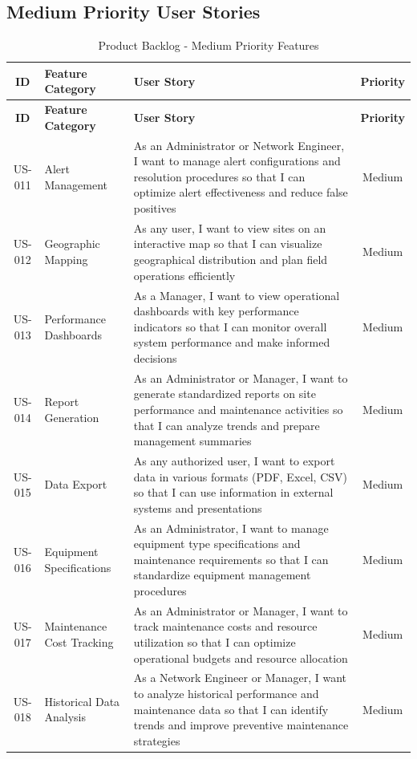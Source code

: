 \subsection{Medium Priority User Stories}

\begin{longtable}{|c|p{3.5cm}|p{7.5cm}|c|}
\caption{Product Backlog - Medium Priority Features} \\
\hline
\textbf{ID} & \textbf{Feature Category} & \textbf{User Story} & \textbf{Priority} \\
\hline
\endfirsthead
\hline
\textbf{ID} & \textbf{Feature Category} & \textbf{User Story} & \textbf{Priority} \\
\hline
\endhead
US-011 & Alert Management & As an Administrator or Network Engineer, I want to manage alert configurations and resolution procedures so that I can optimize alert effectiveness and reduce false positives & Medium \\
\hline
US-012 & Geographic Mapping & As any user, I want to view sites on an interactive map so that I can visualize geographical distribution and plan field operations efficiently & Medium \\
\hline
US-013 & Performance Dashboards & As a Manager, I want to view operational dashboards with key performance indicators so that I can monitor overall system performance and make informed decisions & Medium \\
\hline
US-014 & Report Generation & As an Administrator or Manager, I want to generate standardized reports on site performance and maintenance activities so that I can analyze trends and prepare management summaries & Medium \\
\hline
US-015 & Data Export & As any authorized user, I want to export data in various formats (PDF, Excel, CSV) so that I can use information in external systems and presentations & Medium \\
\hline
US-016 & Equipment Specifications & As an Administrator, I want to manage equipment type specifications and maintenance requirements so that I can standardize equipment management procedures & Medium \\
\hline
US-017 & Maintenance Cost Tracking & As an Administrator or Manager, I want to track maintenance costs and resource utilization so that I can optimize operational budgets and resource allocation & Medium \\
\hline
US-018 & Historical Data Analysis & As a Network Engineer or Manager, I want to analyze historical performance and maintenance data so that I can identify trends and improve preventive maintenance strategies & Medium \\
\hline
\end{longtable}

